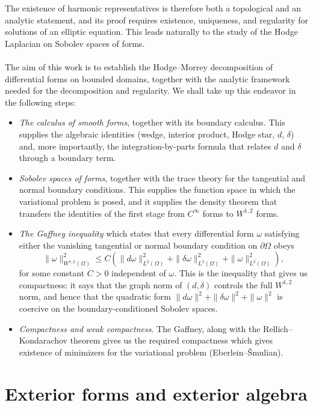 The existence of harmonic representatives is therefore both a
topological and an analytic statement, and its proof requires
existence, uniqueness, and regularity for solutions of an elliptic
equation. This leads naturally to the study of the Hodge Laplacian on
Sobolev spaces of forms.
\\\\The aim of this work is to establish the Hodge--Morrey decomposition
of differential forms on bounded domains, together with the analytic
framework needed for the decomposition and regularity. We shall take up this endeavor in the following steps:

\begin{itemize}
    \item[--] \emph{The calculus of smooth forms}, together with its boundary
    calculus. This supplies the algebraic identities (wedge, interior
    product, Hodge star, \(d\), \(\delta\)) and, more importantly, the
    integration-by-parts formula that relates \(d\) and \(\delta\) through
    a boundary term. 
    \item[--] \emph{Sobolev spaces of forms}, together with the trace theory
    for the tangential and normal boundary conditions. This supplies the
    function space in which the variational problem is posed, and it
    supplies the density theorem that transfers the identities of the
    first stage from \(C^\infty\) forms to \(W^{1,2}\) forms.
    \item[--] \emph{The Gaffney inequality} which states that every differential form $\omega$ satisfying either
the vanishing tangential or normal boundary condition on $\partial\Omega$
obeys
\[
    \|\omega\|_{W^{1,2}(\Omega)}^2
    \leq C\left(
        \|d\omega\|_{L^2(\Omega)}^2
        +\|\delta\omega\|_{L^2(\Omega)}^2
        +\|\omega\|_{L^2(\Omega)}^2
    \right),
\]
for some constant $C>0$ independent of $\omega$. This is the inequality that gives us compactness: it says that the graph norm of \((d,\delta)\) controls the
    full \(W^{1,2}\) norm, and hence that the quadratic form
    \(\|d\omega\|^2+\|\delta\omega\|^2+\|\omega\|^2\) is coercive on the
    boundary-conditioned Sobolev spaces.
    \item[--] \emph{Compactness and weak compactness}. The Gaffney, along with the Rellich--Kondarachov theorem gives us the required compactness which gives existence of minimizers for the variational
    problem (Eberlein--\v{S}mulian).
\end{itemize}


\chapter{Exterior forms and exterior algebra}

